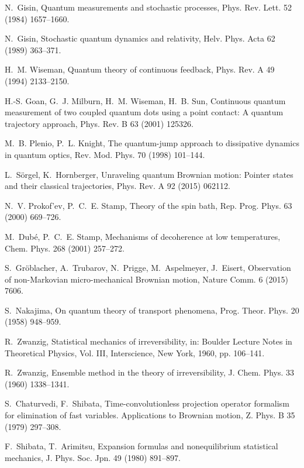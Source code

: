 \documentclass[3p,sort&compress,12pt]{elsarticle}
\begin{document}
\begin{thebibliography}{100}
N.~Gisin, Quantum measurements and stochastic processes, Phys. Rev. Lett. 52
  (1984) 1657--1660.

N.~Gisin, Stochastic quantum dynamics and relativity, Helv. Phys. Acta 62
  (1989) 363--371.

H.~M. Wiseman, Quantum theory of continuous feedback, Phys. Rev. A 49 (1994)
  2133--2150.

H.-S. Goan, G.~J. Milburn, H.~M. Wiseman, H.~B. Sun, Continuous quantum
  measurement of two coupled quantum dots using a point contact: A quantum
  trajectory approach, Phys. Rev. B 63 (2001) 125326.

M.~B. Plenio, P.~L. Knight, The quantum-jump approach to dissipative dynamics
  in quantum optics, Rev. Mod. Phys. 70 (1998) 101--144.

L.~S{\"o}rgel, K.~Hornberger, Unraveling quantum {B}rownian motion: {P}ointer
  states and their classical trajectories, Phys. Rev. A 92 (2015) 062112.

N.~V. Prokof'ev, P.~C.~E. Stamp, Theory of the spin bath, Rep. Prog. Phys. 63
  (2000) 669--726.

M.~Dub{\'e}, P.~C.~E. Stamp, Mechanisms of decoherence at low temperatures,
  Chem. Phys. 268 (2001) 257--272.

S.~Gr{\"o}blacher, A.~Trubarov, N.~Prigge, M.~Aspelmeyer, J.~Eisert,
  Observation of non-{M}arkovian micro-mechanical {B}rownian motion, Nature
  Comm. 6 (2015) 7606.

S.~Nakajima, On quantum theory of transport phenomena, Prog. Theor. Phys. 20
  (1958) 948--959.

R.~Zwanzig, Statistical mechanics of irreversibility, in: Boulder Lecture Notes
  in Theoretical Physics, Vol. III, Interscience, New York, 1960, pp. 106--141.

R.~Zwanzig, Ensemble method in the theory of irreversibility, J. Chem. Phys. 33
  (1960) 1338--1341.

S.~Chaturvedi, F.~Shibata, Time-convolutionless projection operator formalism
  for elimination of fast variables. {A}pplications to {B}rownian motion, Z.
  Phys. B 35 (1979) 297--308.

F.~Shibata, T.~Arimitsu, Expansion formulas and nonequilibrium statistical
  mechanics, J. Phys. Soc. Jpn. 49 (1980) 891--897.


\end{thebibliography}
\end{document}
